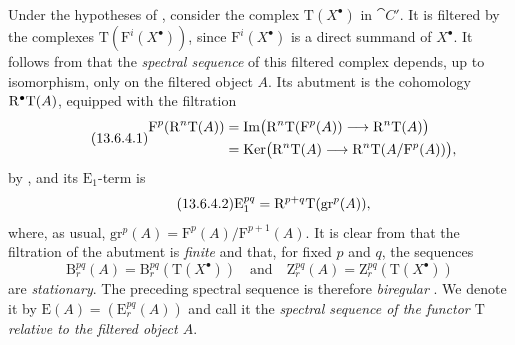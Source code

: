 \begin{env}[13.6.4]
\label{0.13.6.4}
Under the hypotheses of , consider the complex
$\mathrm{T}(X^\bullet)$ in $\cat{C}'$.
It is filtered by the complexes
$\mathrm{T}(\mathrm{F}^i(X^\bullet))$, since
$\mathrm{F}^i(X^\bullet)$ is a direct summand of $X^\bullet$.
It follows from  that the \emph{spectral sequence} of
this filtered complex depends, up to isomorphism, only on the
filtered object $A$.
Its abutment is the cohomology $\mathrm{R}^\bullet\mathrm{T}(A)$, equipped
with the filtration
\begin{equation}
\label{0.13.6.4.1}
\tag{13.6.4.1}
  \begin{split}
  \mathrm{F}^p(\mathrm{R}^n\mathrm{T}(A))
  &=
  \operatorname{Im}\bigl(
    \mathrm{R}^n\mathrm{T}(\mathrm{F}^p(A))
    \longrightarrow
    \mathrm{R}^n\mathrm{T}(A)
  \bigr)
  \\
  &=
  \operatorname{Ker}\bigl(
    \mathrm{R}^n\mathrm{T}(A)
    \longrightarrow
    \mathrm{R}^n\mathrm{T}(A/\mathrm{F}^p(A))
  \bigr),
  \end{split}
\end{equation}
by , and its $\mathrm{E}_1$-term is
\begin{equation}
\label{0.13.6.4.2}
\tag{13.6.4.2}
  \mathrm{E}_1^{pq}
  =
  \mathrm{R}^{p+q}\mathrm{T}(\mathrm{gr}^p(A)),
\end{equation}
where, as usual,
$\mathrm{gr}^p(A)=\mathrm{F}^p(A)/\mathrm{F}^{p+1}(A)$.
It is clear from  that the filtration of the abutment
is \emph{finite} and that, for fixed $p$ and $q$, the sequences
\[
  \mathrm{B}_r^{pq}(A)
  =
  \mathrm{B}_r^{pq}(\mathrm{T}(X^\bullet))
  \quad\text{and}\quad
  \mathrm{Z}_r^{pq}(A)
  =
  \mathrm{Z}_r^{pq}(\mathrm{T}(X^\bullet))
\]
are \emph{stationary}.
The preceding spectral sequence is therefore \emph{biregular}
.
We denote it by
$\mathrm{E}(A)=(\mathrm{E}_r^{pq}(A))$ and call it the
\emph{spectral sequence of the functor $\mathrm{T}$ relative to the
filtered object $A$}.
\end{env}

